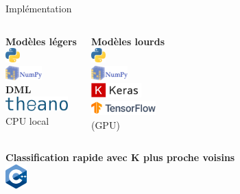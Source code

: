 \documentclass[10pt,xcolor={x11names}]{beamer}
\newcommand{\sectitle}[1]{{\large\color{titleblue}\textbf{#1}\\\smallskip}}
\begin{document}
\begin{frame}{Implémentation}
	\begin{columns}
		\begin{center}
			\sectitle{Modèles légers}
			\medskip
			\includegraphics[height=1.5em]{python.png}\\\smallskip
			\includegraphics[height=1.5em]{numpy.png}\\\smallskip
			\textbf{\Large DML} \\\smallskip
			\includegraphics[height=1.5em]{theano.png} \\\smallskip
			CPU local
		\end{center}
		
		\begin{center}
			\sectitle{Modèles lourds}
			\medskip
			\includegraphics[height=1.5em]{python.png}\\\smallskip
			\includegraphics[height=1.5em]{numpy.png}\\\smallskip
			\includegraphics[height=1.5em]{keras.png} \\\smallskip
			\includegraphics[height=1.5em]{tensorflow.png} \\\smallskip
			 (GPU)
		\end{center}
	\end{columns}
	\begin{center}
		\sectitle{Classification rapide avec K plus proche voisins}
		\medskip
		\includegraphics[height=2.5em]{cpp.png}
	\end{center}
\end{frame}
\end{document}
